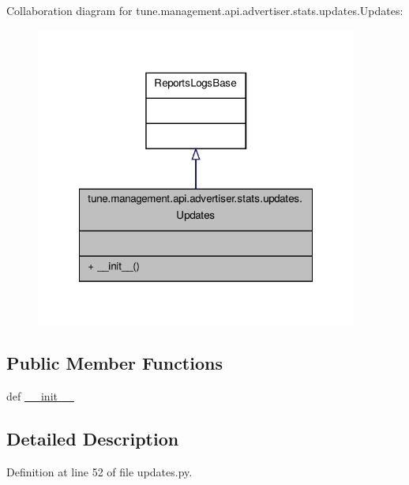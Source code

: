 Collaboration diagram for tune.\-management.\-api.\-advertiser.\-stats.\-updates.\-Updates\-:
\nopagebreak
\begin{figure}[H]
\begin{center}
\leavevmode
\includegraphics[width=300pt]{classtune_1_1management_1_1api_1_1advertiser_1_1stats_1_1updates_1_1Updates__coll__graph}
\end{center}
\end{figure}
\subsection*{Public Member Functions}
\begin{DoxyCompactItemize}
\item 
def \hyperlink{classtune_1_1management_1_1api_1_1advertiser_1_1stats_1_1updates_1_1Updates_a2c2988c09c49b5cd99e387bf9cb61c0b}{\-\_\-\-\_\-init\-\_\-\-\_\-}
\end{DoxyCompactItemize}


\subsection{Detailed Description}


Definition at line 52 of file updates.\-py.



